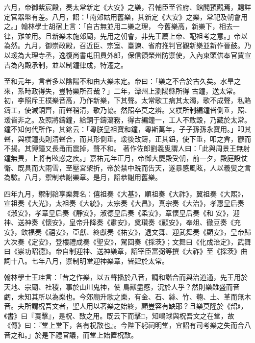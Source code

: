 \begin{pinyinscope}
 六月，帝御紫宸殿，奏太常新定《大安》之樂，召輔臣至省府、館閣預觀焉，賜詳定官器幣有差。八月，詔：「南郊姑用舊樂，其新定《大安》之樂，常祀及朝會用之。」翰林學士胡宿上言：「自古無並用二樂之理，
 今舊樂高，新樂下，相去一律，難並用。且新樂未施郊廟，先用之朝會，非先王薦上帝、配祖考之意。」帝以為然。九月，御崇政殿，召近臣、宗室、臺諫、省府推判官觀新樂並新作晉鼓。乃以瑗為大理寺丞，逸復尚書屯田員外郎，保信領榮州防禦使，入內東頭供奉官賈宣吉為內殿承制，並以制鐘律成，特遷之。



 至和元年，言者多以陰陽不和由大樂未定。帝曰：「樂之不合於古久矣。水旱之來，系時政得失，豈特樂所召哉？」二年，潭州上瀏陽縣所得
 古鐘，送太常。初，李照斥王樸樂音高，乃作新樂，下其聲。太常歌工病其太濁，歌不成聲，私賂鑄工，使減銅齊，而聲稍清，歌乃協。然照卒莫之辨。又樸所制編鐘皆側垂，照、瑗皆非之。及照將鑄鐘，給銅于鑄瀉務，得古編鐘一，工人不敢毀，乃藏於太常。鐘不知何代所作，其銘云：「粵朕皇祖寶和鐘，粵斯萬年，子子孫孫永寶用。」叩其聲，與樸鐘夷則清聲合，而其形側垂。瑗後改鑄，正其鈕，使下垂，叩之弇，鬱而不揚。其鎛鐘又長甬而震掉，聲不和。
 著作佐郎劉羲叟謂人曰：「此與周景王無射鐘無異，上將有眩惑之疾。」嘉祐元年正月，帝御大慶殿受朝，前一夕，殿庭設仗衛、既具而大雨雪，至壓宮架折，帝於禁中跣而告天，遂暴感風眩，人以羲叟之言為驗。八月，禦制恭謝樂章。是月，詔恭謝用舊樂。



 四年九月，禦制祫享樂舞名：僖祖奏《大基》，順祖奏《大祚》，翼祖奏《大熙》，宣祖奏《大光》，太祖奏《大統》，太宗奏《大昌》，真宗奏《大治》，孝惠皇后奏《淑安》，孝章皇后奏《靜安》，淑德皇后奏《柔安》，章懷皇后奏《和
 安》，迎神、送神奏《懷安》，皇帝升降奏《肅安》，奠瓚奏《顧安》，奉俎、徹豆奏《充安》，飲福奏《禧安》，亞獻、終獻奏《祐安》，退文舞、迎武舞奏《顯安》，皇帝歸大次奏《定安》，登樓禮成奏《聖安》，駕回奏《採茨》；文舞曰《化成治定》，武舞曰《崇功昭德》。帝自制迎神、送神樂章，詔宰臣富弼等撰《大祚》至《採茨》曲詞十八。七年八月，禦制明堂迎神樂章，皆肄於太常。



 翰林學士王珪言：「昔之作樂，以五聲播於八音，調和諧合而與治道通，先王用於天地、宗廟、社稷，事於山川鬼神，使
 鳥獸盡感，況於人乎？然則樂雖盛而音虧，未知其所以為樂也。今郊廟升歌之樂，有金、石、絲、竹、匏、土、革而無木音。夫所謂柷吾文者，聖人用以著樂之始終，顧豈容有缺耶？且樂莫隆於《韶》，《書》曰『戛擊』，是柷、敔之用。既云下而擊□，知鳴球與柷吾文之在堂，故《傳》曰：『堂上堂下，各有柷敔也』。今陛下躬祠明堂，宜詔有司考樂之失而合八音之和。」於是下禮官議，而堂上始置柷敔。




\end{pinyinscope}
